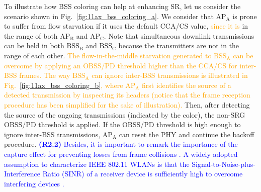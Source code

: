 \documentclass{ieeeaccess}
\begin{document}
To illustrate how BSS coloring can help at enhancing SR, let us consider the scenario shown in Fig.~\ref{fig:11ax_bss_coloring_a}. We consider that $\text{AP}_\text{A}$ is prone to suffer from flow starvation if it uses the default CCA/CS value, \textcolor{orange}{since it is} in the range of both $\text{AP}_\text{B}$ and $\text{AP}_\text{C}$. Note that simultaneous downlink transmissions can be held in both $\text{BSS}_\text{B}$ and $\text{BSS}_\text{C}$ because the transmitters are not in the range of each other. \textcolor{orange}{The flow-in-the-middle starvation generated to $\text{BSS}_\text{A}$ can be overcome by applying an OBSS/PD threshold higher than the CCA/CS for inter-BSS frames. The way $\text{BSS}_\text{A}$ can ignore inter-BSS transmissions is illustrated in Fig.~\ref{fig:11ax_bss_coloring_b}, where $\text{AP}_\text{A}$ first identifies the source of a detected transmission by inspecting its headers (notice that the frame reception procedure has been simplified for the sake of illustration).} Then, after detecting the source of the ongoing transmissions (indicated by the color), the non-SRG OBSS/PD threshold is applied. If the OBSS/PD threshold is high enough to ignore inter-BSS transmissions, $\text{AP}_\text{A}$ can reset the PHY and continue the backoff procedure. \textcolor{blue}{\textbf{(R2.2)} Besides, it is important to remark the importance of the capture effect for preventing losses from frame collisions \cite{lee2007experimental}. A widely adopted assumption to characterize IEEE 802.11 WLANs is that the Signal-to-Noise-plus-Interference Ratio (SINR) of a receiver device is sufficiently high to overcome interfering devices \cite{durvy2007modeling}.}
\end{document}
